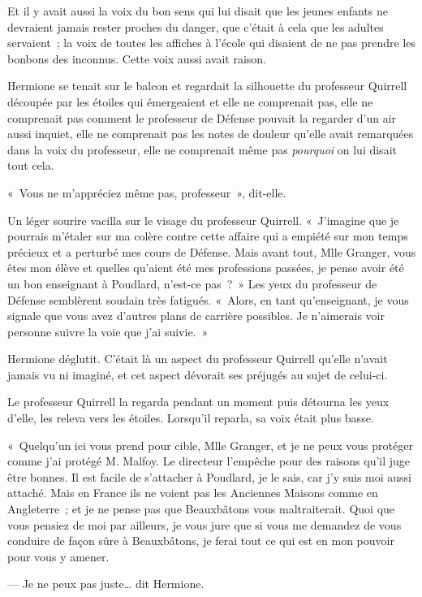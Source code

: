 Et il y avait aussi la voix du bon sens qui lui disait que les jeunes enfants ne devraient jamais rester proches du danger, que c'était à cela que les adultes servaient~; la voix de toutes les affiches à l'école qui disaient de ne pas prendre les bonbons des inconnus.
Cette voix aussi avait raison.

Hermione se tenait sur le balcon et regardait la silhouette du professeur Quirrell découpée par les étoiles qui émergeaient et elle ne comprenait pas, elle ne comprenait pas comment le professeur de Défense pouvait la regarder d'un air aussi inquiet, elle ne comprenait pas les notes de douleur qu'elle avait remarquées dans la voix du professeur, elle ne comprenait même pas \emph{pourquoi} on lui disait tout cela.

«~Vous ne m'appréciez même pas, professeur~», dit-elle.

Un léger sourire vacilla sur le visage du professeur Quirrell.
«~J'imagine que je pourrais m'étaler sur ma colère contre cette affaire qui a empiété sur mon temps précieux et a perturbé mes cours de Défense.
Mais avant tout, Mlle Granger, vous êtes mon élève et quelles qu'aient été mes professions passées, je pense avoir été un bon enseignant à Poudlard, n'est-ce pas~?~»
Les yeux du professeur de Défense semblèrent soudain très fatigués.
«~Alors, en tant qu'enseignant, je vous signale que vous avez d'autres plans de carrière possibles.
Je n'aimerais voir personne suivre la voie que j'ai suivie.~»

Hermione déglutit.
C'était là un aspect du professeur Quirrell qu'elle n'avait jamais vu ni imaginé, et cet aspect dévorait ses préjugés au sujet de celui-ci.

Le professeur Quirrell la regarda pendant un moment puis détourna les yeux d'elle, les releva vers les étoiles.
Lorsqu'il reparla, sa voix était plus basse.

«~Quelqu'un ici vous prend pour cible, Mlle Granger, et je ne peux vous protéger comme j'ai protégé M. Malfoy.
Le directeur l'empêche pour des raisons qu'il juge être bonnes.
Il est facile de s'attacher à Poudlard, je le sais, car j'y suis moi aussi attaché.
Mais en France ils ne voient pas les Anciennes Maisons comme en Angleterre~; et je ne pense pas que Beauxbâtons vous maltraiterait.
Quoi que vous pensiez de moi par ailleurs, je vous jure que si vous me demandez de vous conduire de façon sûre à Beauxbâtons, je ferai tout ce qui est en mon pouvoir pour vous y amener.

--- Je ne peux pas juste… dit Hermione.

